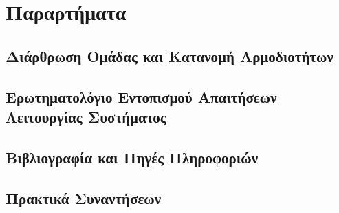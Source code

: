 \chapter{Παραρτήματα}
		
\section{Διάρθρωση Ομάδας και Κατανομή Αρμοδιοτήτων}
\section{Ερωτηματολόγιο Εντοπισμού Απαιτήσεων Λειτουργίας Συστήματος}
\section{Βιβλιογραφία και Πηγές Πληροφοριών}
\section{Πρακτικά Συναντήσεων}
